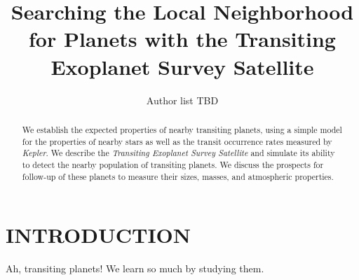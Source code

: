 \documentclass{emulateapj}
\begin{document}
%
\def\ltsima{$\; \buildrel < \over \sim \;$}
\def\lsim{\lower.5ex\hbox{\ltsima}}
\def\gtsima{$\; \buildrel > \over \sim \;$}
\def\gsim{\lower.5ex\hbox{\gtsima}}
\def\tess{{\it TESS} }
\def \teff {T_{\rm eff}}
\def \phir {\Phi_{\rm R}}
\def \fov {24$^{\circ}$}
\def \pixsz {21.1''}
\def \aeff {69.1 cm$^2$ }    
\def \epd {105 mm}                          
                                                                                          
%



\title{ Searching the Local Neighborhood for Planets with the
  Transiting Exoplanet Survey Satellite }

\author{
Author list TBD
}




\begin{abstract}

  We establish the expected properties of nearby transiting planets,
  using a simple model for the properties of nearby stars as well as
  the transit occurrence rates measured by {\it Kepler}. We describe
  the {\it Transiting Exoplanet Survey Satellite} and simulate its
  ability to detect the nearby population of transiting planets. We
  discuss the prospects for follow-up of these planets to measure
  their sizes, masses, and atmospheric properties.

\end{abstract}


\section{INTRODUCTION}

Ah, transiting planets! We learn so much by studying them.
\end{document}
